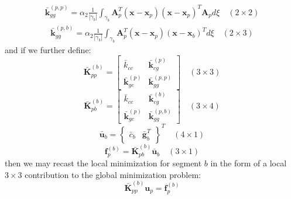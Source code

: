 \documentclass[11pt]{article} %
\begin{document}
\begin{eqnarray}
	\bar{\mathbf{k}}_{gg}^{(p,p)} = \alpha_2 \frac{1}{| \gamma_b |} \int_{\gamma_b} \mathbf{A}^T_p (\mathbf{x} - \mathbf{x}_p) (\mathbf{x} - \mathbf{x}_p)^T \mathbf{A}_p d \xi \quad (2 \times 2)
\end{eqnarray}
\begin{eqnarray}
	\bar{\mathbf{k}}_{gg}^{(p,b)} = \alpha_2 \frac{1}{| \gamma_b |} \int_{\gamma_b} \mathbf{A}^T_p (\mathbf{x} - \mathbf{x}_p) (\mathbf{x} - \mathbf{x}_b)^T d \xi \quad (2 \times 3)
\end{eqnarray}
and if we further define:
\begin{equation}
	\bar{\mathbf{K}}_{pp}^{(b)} = \left[ \begin{array}{cc} \bar{k}_{cc} & \bar{\mathbf{k}}_{cg}^{(p)} \\ \bar{\mathbf{k}}_{gc}^{(p)} & \bar{\mathbf{k}}_{gg}^{(p,p)} \end{array} \right] \quad (3 \times 3)
\end{equation}
\begin{equation}
	\bar{\mathbf{K}}_{pb}^{(b)} = \left[ \begin{array}{cc} \bar{k}_{cc} & \bar{\mathbf{k}}_{cg}^{(b)} \\ \bar{\mathbf{k}}_{gc}^{(p)} & \bar{\mathbf{k}}_{gg}^{(p,b)} \end{array} \right] \quad (3 \times 4)
\end{equation}
\begin{equation}
	\bar{\mathbf{u}}_b = \left\{ \begin{array}{cc} \bar{c}_b & \bar{\mathbf{g}}^T_b \end{array} \right\}^T \quad (4 \times 1)
\end{equation}
\begin{equation}
	\mathbf{f}^{(b)}_p = \bar{\mathbf{K}}_{pb}^{(b)} \bar{\mathbf{u}}_b \quad (3 \times 1)
\end{equation}
then we may recast the local minimization for segment $b$ in the form of a local $3\times3$ contribution to the global minimization problem:
\begin{equation}
	\bar{\mathbf{K}}_{pp}^{(b)} \mathbf{u}_p = \mathbf{f}^{(b)}_p
\end{equation}
\end{document}
